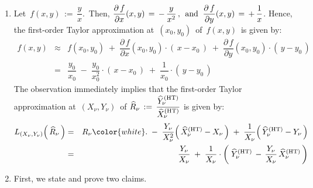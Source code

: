 
\vskip 0.5cm
\noindent
\proof
\begin{enumerate}
\item
    Let \,$f(x,y) \,:=\, \dfrac{y}{x}$.\,
    Then,
    \;\;$
    \dfrac{\partial\,f}{\partial x}(x,y)
    \, = \,
        -\,\dfrac{y}{x^{2}}\,,
    \;\,
    \textnormal{and}
    \;\;
    \dfrac{\partial\,f}{\partial y}(x,y)
    \, = \,
        +\,\dfrac{1}{x}
    $.\;\;
    Hence, the first-order Taylor approximation at \,$(x_{0},y_{0})$\, of \,$f(x,y)$\, is given by:
    \begin{eqnarray*}
    f(x,y)
    & \approx &
        f(x_{0},y_{0})
        \; + \;
        \dfrac{\partial\,f}{\partial x}(x_{0},y_{0})\cdot\left(\,x - x_{0}\,\right)
        \; + \;
        \dfrac{\partial\,f}{\partial y}(x_{0},y_{0})\cdot\left(\,y - y_{0}\,\right)
    \\
    & = &
        \dfrac{ y_{0} }{ x_{0} }
        \; - \;
        \dfrac{y_{0}}{x_{0}^{2}}\cdot\left(\,x - x_{0}\,\right)
        \; + \;
        \dfrac{1}{x_{0}}\cdot\left(\,y - y_{0}\,\right)
    \end{eqnarray*}
    The observation immediately implies that the first-order Taylor approximation at
    \,$(X_{\nu},Y_{\nu})$\,
    of
    \;$
    \widehat{R}_{\nu}
    \, := \,
        \dfrac{
            \widehat{Y}^{\textnormal{(HT)}}_{\nu}
            }{
            \widehat{X}^{\textnormal{(HT)}}_{\nu}
            }
    $\;
    is given by:
    \begin{eqnarray*}
    L_{(X_{\nu},Y_{\nu})}\!\left(\,\widehat{R}_{\nu}\,\right)
    & = &
        R_{\nu}
        {\color{white}.}
        \; - \;
        \dfrac{Y_{\nu}}{X_{\nu}^{2}}\!\left(\,\widehat{X}^{\textnormal{(HT)}}_{\nu} - X_{\nu} \,\right)
        \; + \;
        \dfrac{1}{X_{\nu}}\!\left(\,\widehat{Y}^{\textnormal{(HT)}}_{\nu} - Y_{\nu} \,\right)
    \\
    & = &
        \dfrac{ Y_{\nu} }{ X_{\nu} }
        \; + \;
        \dfrac{1}{X_{\nu}}
        \cdot
        \left(\;
            \widehat{Y}^{\textnormal{(HT)}}_{\nu}
            \,-\,
            \dfrac{ Y_{\nu} }{ X_{\nu} }
            \,
            \widehat{X}^{\textnormal{(HT)}}_{\nu}
            \,\right)
    \end{eqnarray*}
\item
    First, we state and prove two claims.


\end{enumerate}
